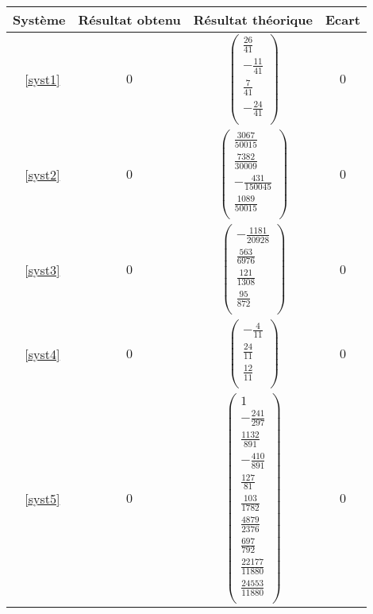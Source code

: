 \documentclass{report}
\begin{document}
        \begin{tabular}{|c|c|c|c|}
           \hline
           Système & Résultat obtenu & Résultat théorique & Ecart \\ %
           \hline
           ~\eqref{syst1} & $0$ & $\begin{pmatrix}
				\frac{26}{41} \\
				-\frac{11}{41} \\
				\frac{7}{41} \\
				-\frac{24}{41} \\
			     \end{pmatrix}$          & $0$ \\
	    \hline
           ~\eqref{syst2} & $0$ & $\begin{pmatrix}
				\frac{3067}{50015} \\
				\frac{7382}{30009} \\
				-\frac{431}{150045} \\
				\frac{1089}{50015} \\
			     \end{pmatrix}$          & $0$ \\
	    \hline
           ~\eqref{syst3} & $0$ & $\begin{pmatrix}
				-\frac{1181}{20928} \\
				\frac{563}{6976} \\
				\frac{121}{1308} \\
				\frac{95}{872} \\
			     \end{pmatrix}$          & $0$ \\
	    \hline
           ~\eqref{syst4} & $0$ & $\begin{pmatrix}
				-\frac{4}{11} \\
				\frac{24}{11} \\
				\frac{12}{11} \\
			     \end{pmatrix}$          & $0$ \\
	    \hline
           ~\eqref{syst5} & $0$ & $\begin{pmatrix}
				1 \\
				-\frac{241}{297} \\
				\frac{1132}{891} \\
				-\frac{410}{891} \\
				\frac{127}{81} \\
				\frac{103}{1782} \\
				\frac{4879}{2376} \\
				\frac{697}{792} \\
				\frac{22177}{11880} \\
				\frac{24553}{11880} \\
			     \end{pmatrix}$          & $0$ \\
	    \hline

         \end{tabular}
         \renewcommand{\arraystretch}{1}
    \newpage
\end{document}
